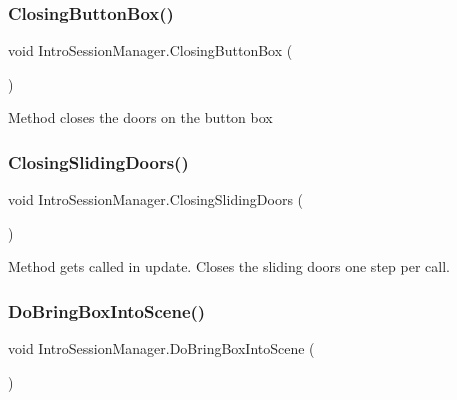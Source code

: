 \subsubsection{\texorpdfstring{Closing\+Button\+Box()}{ClosingButtonBox()}}
{\footnotesize\ttfamily void Intro\+Session\+Manager.\+Closing\+Button\+Box (\begin{DoxyParamCaption}{ }\end{DoxyParamCaption})\hspace{0.3cm}{\ttfamily [private]}}



Method closes the doors on the button box 

\mbox{\label{class_intro_session_manager_a7cc8cfc2810a691bbc149f9688f68118}} 
\subsubsection{\texorpdfstring{Closing\+Sliding\+Doors()}{ClosingSlidingDoors()}}
{\footnotesize\ttfamily void Intro\+Session\+Manager.\+Closing\+Sliding\+Doors (\begin{DoxyParamCaption}{ }\end{DoxyParamCaption})\hspace{0.3cm}{\ttfamily [private]}}



Method gets called in update. Closes the sliding doors one step per call. 

\mbox{\label{class_intro_session_manager_a8ea998890634808b09e0f05a68d81d64}} 
\subsubsection{\texorpdfstring{Do\+Bring\+Box\+Into\+Scene()}{DoBringBoxIntoScene()}}
{\footnotesize\ttfamily void Intro\+Session\+Manager.\+Do\+Bring\+Box\+Into\+Scene (\begin{DoxyParamCaption}{ }\end{DoxyParamCaption})\hspace{0.3cm}{\ttfamily [private]}}



